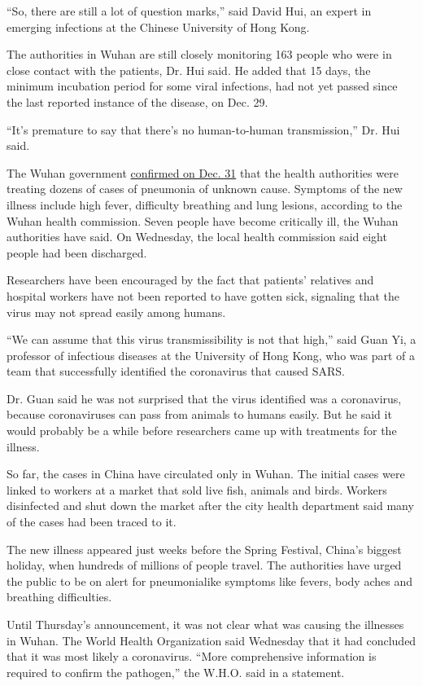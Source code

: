 ``So, there are still a lot of question marks,'' said David Hui, an
expert in emerging infections at the Chinese University of Hong Kong.

The authorities in Wuhan are still closely monitoring 163 people who
were in close contact with the patients, Dr. Hui said. He added that 15
days, the minimum incubation period for some viral infections, had not
yet passed since the last reported instance of the disease, on Dec. 29.

``It's premature to say that there's no human-to-human transmission,''
Dr. Hui said.

The Wuhan government
\href{http://wjw.wuhan.gov.cn/front/web/showDetail/2019123108989}{confirmed
on Dec. 31} that the health authorities were treating dozens of cases of
pneumonia of unknown cause. Symptoms of the new illness include high
fever, difficulty breathing and lung lesions, according to the Wuhan
health commission. Seven people have become critically ill, the Wuhan
authorities have said. On Wednesday, the local health commission said
eight people had been discharged.

Researchers have been encouraged by the fact that patients' relatives
and hospital workers have not been reported to have gotten sick,
signaling that the virus may not spread easily among humans.

``We can assume that this virus transmissibility is not that high,''
said Guan Yi, a professor of infectious diseases at the University of
Hong Kong, who was part of a team that successfully identified the
coronavirus that caused SARS.

Dr. Guan said he was not surprised that the virus identified was a
coronavirus, because coronaviruses can pass from animals to humans
easily. But he said it would probably be a while before researchers came
up with treatments for the illness.

So far, the cases in China have circulated only in Wuhan. The initial
cases were linked to workers at a market that sold live fish, animals
and birds. Workers disinfected and shut down the market after the city
health department said many of the cases had been traced to it.

The new illness appeared just weeks before the Spring Festival, China's
biggest holiday, when hundreds of millions of people travel. The
authorities have urged the public to be on alert for pneumonialike
symptoms like fevers, body aches and breathing difficulties.

Until Thursday's announcement, it was not clear what was causing the
illnesses in Wuhan. The World Health Organization said Wednesday that it
had concluded that it was most likely a coronavirus. ``More
comprehensive information is required to confirm the pathogen,'' the
W.H.O. said in a statement.

